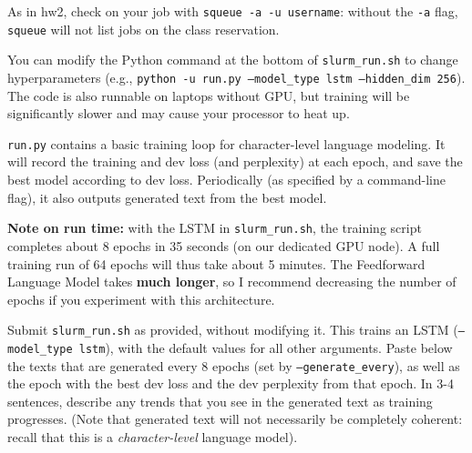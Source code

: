 \documentclass[11pt]{article}
\begin{document}
\noindent As in hw2, check on your job with \texttt{squeue -a -u username}: without the \texttt{-a} flag, \texttt{squeue} will not list jobs on the class reservation.

\noindent You can modify the Python command at the bottom of \texttt{slurm\_run.sh} to change hyperparameters (e.g., \texttt{python -u run.py --model\_type lstm --hidden\_dim 256}). The code is also runnable on laptops without GPU, but training will be significantly slower and may cause your processor to heat up.

\texttt{run.py} contains a basic training loop for character-level language modeling. It will record the training and dev loss (and perplexity) at each epoch, and save the best model according to dev loss.  Periodically (as specified by a command-line flag), it also outputs generated text from the best model. 

\textbf{Note on run time:} with the LSTM in \texttt{slurm\_run.sh}, the training script completes about 8 epochs in 35 seconds (on our dedicated GPU node). A full training run of 64 epochs will thus take about 5 minutes. The Feedforward Language Model takes \textbf{much longer}, so I recommend decreasing the number of epochs if you experiment with this architecture.

\vspace{2em}
 Submit \texttt{slurm\_run.sh} as provided, without modifying it. This trains an LSTM (\texttt{--model\_type lstm}), with the default values for all other arguments.  Paste below the texts that are generated every 8 epochs (set by \texttt{--generate\_every}), as well as the epoch with the best dev loss and the dev perplexity from that epoch. In 3-4 sentences, describe any trends that you see in the generated text as training progresses. (Note that generated text will not necessarily be completely coherent: recall that this is a \emph{character-level} language model).
\end{document}
